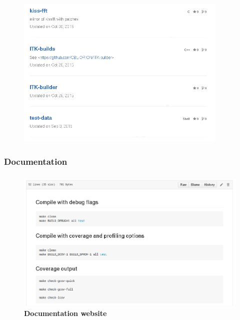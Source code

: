 \documentclass{beamer}
\begin{document}
\begin{frame}\frametitle{\subsubsecname}
	\begin{figure}[tbp]
		\centering
		\includegraphics[width=0.9\textwidth]{gfx/gh-dep_1}
	\end{figure}
\end{frame}

\subsubsection{Documentation}
\begin{frame}\frametitle{\subsubsecname}
		\begin{figure}[tbp]
			\centering
			\includegraphics[width=1.0\textwidth]{gfx/doc-dev}
			\caption{\textbf{Documentation website}
			}\label{fig:doc-wiki}
		\end{figure}
\end{frame}
\end{document}
